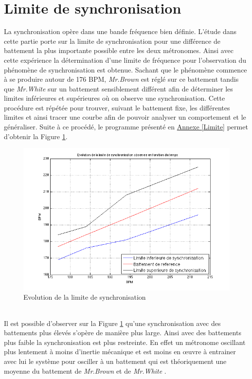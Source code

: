 \documentclass[a4paper,11pt]{report}
\begin{document}
\section{Limite de synchronisation}
La synchronisation opère dans une bande fréquence bien définie. L'étude dans cette partie porte sur la limite de synchronisation pour une différence de battement la plus importante possible entre les deux métronomes. Ainsi avec cette expérience la détermination d'une limite de fréquence pour l'observation du phénomène de synchronisation est obtenue. Sachant que le phénomène commence à se produire autour de 176 BPM, {\it Mr.Brown} est réglé sur ce battement tandis que {\it Mr.White} sur un battement sensiblement différent afin de déterminer les limites inférieures et supérieures où on observe une synchronisation. Cette procédure est répétée pour trouver, suivant le battement fixe, les différentes limites et ainsi tracer une courbe afin de pouvoir analyser un comportement et le généraliser. Suite à ce procédé, le programme présenté en \underline{Annexe \ref{Limite}} permet d'obtenir la Figure \ref{LimiteF}.
\begin{figure}[h]
\centering
\includegraphics[width=1\textwidth]{CourbeLimiteSynchro}
\caption{Evolution de la limite de synchronisation}\label{LimiteF}
\end{figure}\\
Il est possible d'observer sur la Figure \ref{LimiteF} qu'une synchronisation avec des battements plus élevés s'opère de manière plus large. Ainsi avec des battements plus faible la synchronisation est plus restreinte. En effet un métronome oscillant plus lentement à moins d'inertie mécanique et est moins en œuvre à entrainer avec lui le système pour osciller à un battement qui est théoriquement une moyenne du battement de {\it Mr.Brown} et de {\it Mr.White} \cite{piko}.
\end{document}
